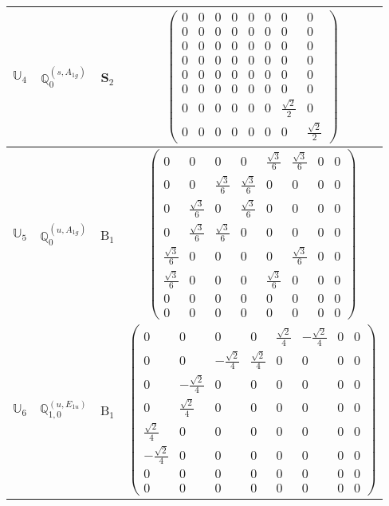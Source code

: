 \documentclass[fleqn,10pt,landscape]{article}
\begin{document}
\begin{itemize}
\begin{center}
\begin{longtable}{c|c|c|c}
$ \mathbb{U}_{4} $ & $\mathbb{Q}_{0}^{(s,A_{1g})}$ & S$_{2}$ & $\begin{pmatrix} 0 & 0 & 0 & 0 & 0 & 0 & 0 & 0 \\ 0 & 0 & 0 & 0 & 0 & 0 & 0 & 0 \\ 0 & 0 & 0 & 0 & 0 & 0 & 0 & 0 \\ 0 & 0 & 0 & 0 & 0 & 0 & 0 & 0 \\ 0 & 0 & 0 & 0 & 0 & 0 & 0 & 0 \\ 0 & 0 & 0 & 0 & 0 & 0 & 0 & 0 \\ 0 & 0 & 0 & 0 & 0 & 0 & \frac{\sqrt{2}}{2} & 0 \\ 0 & 0 & 0 & 0 & 0 & 0 & 0 & \frac{\sqrt{2}}{2} \end{pmatrix}$ \\ \hline
$ \mathbb{U}_{5} $ & $\mathbb{Q}_{0}^{(u,A_{1g})}$ & B$_{1}$ & $\begin{pmatrix} 0 & 0 & 0 & 0 & \frac{\sqrt{3}}{6} & \frac{\sqrt{3}}{6} & 0 & 0 \\ 0 & 0 & \frac{\sqrt{3}}{6} & \frac{\sqrt{3}}{6} & 0 & 0 & 0 & 0 \\ 0 & \frac{\sqrt{3}}{6} & 0 & \frac{\sqrt{3}}{6} & 0 & 0 & 0 & 0 \\ 0 & \frac{\sqrt{3}}{6} & \frac{\sqrt{3}}{6} & 0 & 0 & 0 & 0 & 0 \\ \frac{\sqrt{3}}{6} & 0 & 0 & 0 & 0 & \frac{\sqrt{3}}{6} & 0 & 0 \\ \frac{\sqrt{3}}{6} & 0 & 0 & 0 & \frac{\sqrt{3}}{6} & 0 & 0 & 0 \\ 0 & 0 & 0 & 0 & 0 & 0 & 0 & 0 \\ 0 & 0 & 0 & 0 & 0 & 0 & 0 & 0 \end{pmatrix}$ \\
$ \mathbb{U}_{6} $ & $\mathbb{Q}_{1,0}^{(u,E_{1u})}$ & B$_{1}$ & $\begin{pmatrix} 0 & 0 & 0 & 0 & \frac{\sqrt{2}}{4} & - \frac{\sqrt{2}}{4} & 0 & 0 \\ 0 & 0 & - \frac{\sqrt{2}}{4} & \frac{\sqrt{2}}{4} & 0 & 0 & 0 & 0 \\ 0 & - \frac{\sqrt{2}}{4} & 0 & 0 & 0 & 0 & 0 & 0 \\ 0 & \frac{\sqrt{2}}{4} & 0 & 0 & 0 & 0 & 0 & 0 \\ \frac{\sqrt{2}}{4} & 0 & 0 & 0 & 0 & 0 & 0 & 0 \\ - \frac{\sqrt{2}}{4} & 0 & 0 & 0 & 0 & 0 & 0 & 0 \\ 0 & 0 & 0 & 0 & 0 & 0 & 0 & 0 \\ 0 & 0 & 0 & 0 & 0 & 0 & 0 & 0 \end{pmatrix}$ \\

\end{longtable}
\end{center}
\end{itemize}
\end{document}
